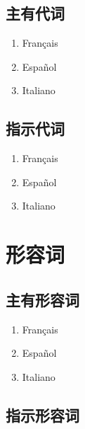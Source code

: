 \documentclass[UTF8,a4paper,titlepage,10pt]{report}
\begin{document}
\section{主有代词}
\label{sec:org51289c8}

\begin{enumerate}
\item Français
\label{sec:orgfb74b57}

\item Español
\label{sec:org83c476e}

\item Italiano
\label{sec:org182038d}
\end{enumerate}

\section{指示代词}
\label{sec:org71b0199}

\begin{enumerate}
\item Français
\label{sec:org207f115}

\item Español
\label{sec:org8ffbb4b}

\item Italiano
\label{sec:orgbc06669}
\end{enumerate}

\chapter{形容词}
\label{sec:org77172fa}

\section{主有形容词}
\label{sec:orgb80dbaa}

\begin{enumerate}
\item Français
\label{sec:orgeb666f1}

\item Español
\label{sec:orgaf1f70e}

\item Italiano
\label{sec:org2b91f4d}
\end{enumerate}

\section{指示形容词}
\label{sec:org9ceef6e}
\end{document}
